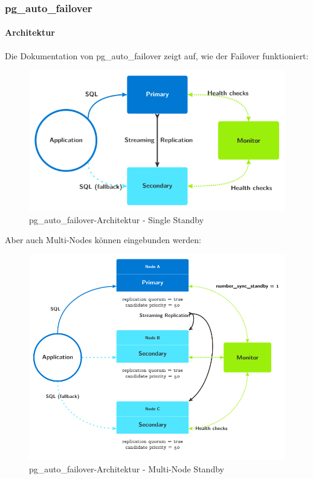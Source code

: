 
\subsubsection{pg\_auto\_failover}
\begin{flushleft}
    \paragraph{Architektur}
    Die Dokumentation von pg\_auto\_failover \cite{PZZIZ5RT} zeigt auf, wie der Failover funktioniert:
    \begin{figure}[H]
        \centering
        \includegraphics[width=0.75\linewidth]{source/implementation/evaluation/postgresql_ha_solutions/pg_auto_failover/pg_auto-failover_arch-single-standby}
        \caption{pg\_auto\_failover-Architektur - Single Standby}
        \label{fig:pg_auto-failover_arch-single-standby}
    \end{figure}

    Aber auch Multi-Nodes können eingebunden werden\cite{4ZKBDG57}:
    \begin{figure}[H]
        \centering
        \includegraphics[width=0.75\linewidth]{source/implementation/evaluation/postgresql_ha_solutions/pg_auto_failover/pg_auto-failover_arch-multi-standby}
        \caption{pg\_auto\_failover-Architektur - Multi-Node Standby}
        \label{fig:pg_auto-failover_arch-multi-standby}
    \end{figure}


\end{flushleft}
